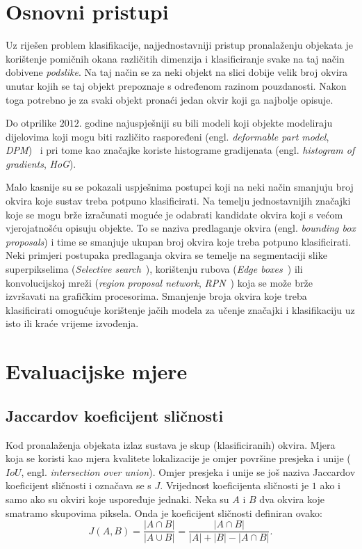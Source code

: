 \documentclass[utf8, seminar, numeric, lmodern]{feri}
\begin{document}
\section{Osnovni pristupi}

Uz riješen problem klasifikacije, najjednostavniji pristup pronalaženju objekata je korištenje pomičnih okana različitih dimenzija i klasificiranje svake na taj način dobivene \emph{podslike}. Na taj način se za neki objekt na slici dobije velik broj okvira unutar kojih se taj objekt prepoznaje s određenom razinom pouzdanosti. Nakon toga potrebno je za svaki objekt pronaći jedan okvir koji ga najbolje opisuje. 

Do otprilike $2012$. godine najuspješniji su bili modeli koji objekte modeliraju dijelovima koji mogu biti različito raspoređeni (engl. \emph{deformable part model}, \emph{DPM})~\cite{objdet2014} i pri tome kao značajke koriste histograme gradijenata (engl. \emph{histogram of gradients}, \emph{HoG}).


Malo kasnije su se pokazali uspješnima postupci koji na neki način smanjuju broj okvira koje sustav treba potpuno klasificirati. Na temelju jednostavnijih značajki koje se mogu brže izračunati moguće je odabrati kandidate okvira koji s većom vjerojatnošću opisuju objekte. To se naziva predlaganje okvira (engl. \emph{bounding box proposals}) i time se smanjuje ukupan broj okvira koje treba potpuno klasificirati. Neki primjeri postupaka predlaganja okvira se temelje na segmentaciji slike superpikselima (\emph{Selective search}~\cite{selectiveSearch}), korištenju rubova (\emph{Edge boxes}~\cite{edgeBoxes}) ili konvolucijskoj mreži (\emph{region proposal network}, \emph{RPN}~\cite{fasterrcnn}) koja se može brže izvršavati na grafičkim procesorima. Smanjenje broja okvira koje treba klasificirati omogućuje korištenje jačih modela za učenje značajki i klasifikaciju uz isto ili kraće vrijeme izvođenja. 


\section{Evaluacijske mjere}

\subsection{Jaccardov koeficijent sličnosti}

Kod pronalaženja objekata izlaz sustava je skup (klasificiranih) okvira. Mjera koja se koristi kao mjera kvalitete lokalizacije je omjer površine presjeka i unije ($\mathit{IoU}$, engl. \emph{intersection over union}). Omjer presjeka i unije se još naziva Jaccardov koeficijent sličnosti i označava se s $J$. Vrijednost koeficijenta sličnosti je $1$ ako i samo ako su okviri koje uspoređuje jednaki. Neka su $A$ i $B$ dva okvira koje smatramo skupovima piksela. Onda je koeficijent sličnosti definiran ovako:
\begin{equation}
J(A,B) = \frac{|A\cap B|}{|A\cup B|} = \frac{|A\cap B|}{|A|+|B|-|A\cap B|}.
\end{equation}
\end{document}
